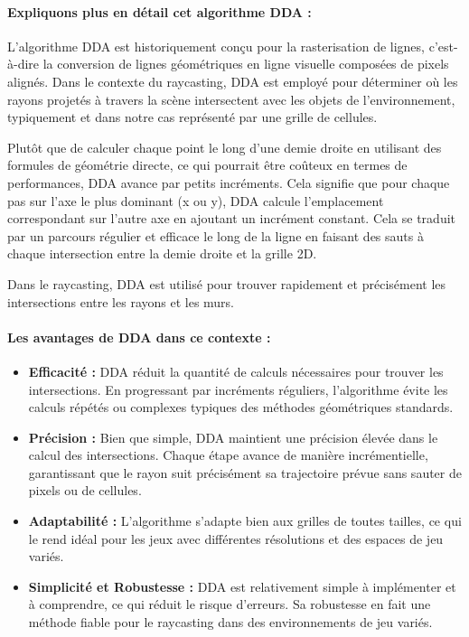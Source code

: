 \documentclass[11pt]{article}
\begin{document}
\paragraph{Expliquons plus en détail cet algorithme DDA :}
L'algorithme DDA est historiquement conçu pour la rasterisation de lignes, c'est-à-dire la conversion de lignes géométriques en ligne visuelle composées de pixels 
alignés. Dans le contexte du raycasting, DDA est employé pour déterminer où les rayons projetés à travers la scène intersectent avec les objets de l'environnement, 
typiquement et dans notre cas représenté par une grille de cellules.

Plutôt que de calculer chaque point le long d'une demie droite en utilisant des formules de géométrie 
directe, ce qui pourrait être coûteux en termes de performances, DDA avance par petits incréments. Cela signifie que pour chaque pas sur l'axe le plus 
dominant (x ou y), DDA calcule l'emplacement correspondant sur l'autre axe en ajoutant un incrément constant. Cela se traduit par un parcours régulier et 
efficace le long de la ligne en faisant des sauts à chaque intersection entre la demie droite et la grille 2D.

Dans le raycasting, DDA est utilisé pour trouver rapidement et précisément les intersections entre les rayons et les murs. 

\paragraph{Les avantages de DDA dans ce contexte :}
\begin{itemize}
\item \textbf{Efficacité :} DDA réduit la quantité de calculs nécessaires pour trouver les intersections. En progressant par 
incréments réguliers, l'algorithme évite les calculs répétés ou complexes typiques des méthodes géométriques standards.
\item \textbf{Précision :} Bien que simple, DDA maintient une précision élevée dans le calcul des intersections. Chaque étape 
avance de manière incrémentielle, garantissant que le rayon suit précisément sa trajectoire prévue sans sauter de pixels ou de cellules.
\item \textbf{Adaptabilité :} L'algorithme s'adapte bien aux grilles de toutes tailles, ce qui le rend idéal pour les jeux avec 
différentes résolutions et des espaces de jeu variés.
\item \textbf{Simplicité et Robustesse :} DDA est relativement simple à implémenter et à comprendre, ce qui réduit le risque 
d'erreurs. Sa robustesse en fait une méthode fiable pour le raycasting dans des environnements de jeu variés.
\end{itemize}
\end{document}
